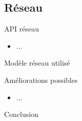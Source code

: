 \documentclass{beamer}
\begin{document}
\subsection{Réseau}

\begin{frame}{API réseau}
    \begin{itemize}
        \item ...
    \end{itemize}
\end{frame}

\begin{frame}{Modèle réseau utilisé}
    
\end{frame}

\begin{frame}{Améliorations possibles}
    \begin{itemize}
        \item ...
    \end{itemize}
\end{frame}

\begin{frame}{Conclusion}
\end{frame}
\end{document}
